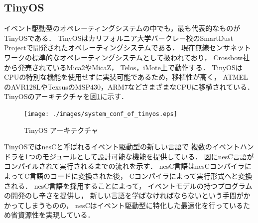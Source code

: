 \subsection{TinyOS}
イベント駆動型のオペレーティングシステムの中でも，最も代表的なものが
TinyOS\cite{Hill:2000:SAD:356989.356998}\cite{Levis04tinyos:an}である．
TinyOSはカリフォルニア大学バークレー校のSmartDust Projectで開発されたオペレーティングシステムである．
現在無線センサネットワークの標準的なオペレーティングシステムとして扱われており，
Crossbow社から発売されているMica2やMicaZ\cite{Hill:2002:MWP:623308.624560}，
Telos\cite{Polastre:2005:TEU:1147685.1147744}，iMote\cite{Nachman:2005:IMP:1147685.1147760}上で動作する．
TinyOSはCPUの特別な機能を使用せずに実装可能であるため，移植性が高く，
ATMELのAVR128LやTexsusのMSP430，ARM7などさまざまなCPUに移植されている．
TinyOSのアーキテクチャを図\ref{fig:system_conf_of_tinyos}に示す．

\begin{figure}[htbp]
 \begin{center}
  \texttt{[image: ./images/system\_conf\_of\_tinyos.eps]}
 \end{center}
 \caption{TinyOS アーキテクチャ}
 \label{fig:system_conf_of_tinyos}
\end{figure}

TinyOSではnesC\cite{Gay:2003:NLH:781131.781133}と呼ばれるイベント駆動型の新しい言語で
複数のイベントハンドラを1つのモジュールとして設計可能な機能を提供している．
図にnesC言語がコンパイルされて実行されるまでの流れを示す．
nesC言語はnesCコンパイラによってC言語のコードに変換された後，
Cコンパイラによって実行形式へと変換される．
nesC言語を採用することによって，
イベントモデルの持つプログラムの開発のし辛さを提供し，
新しい言語を学ばなければならないという手間がかかってしまうものの，
nesCはイベント駆動型に特化した最適化を行っているため省資源性を実現している．


